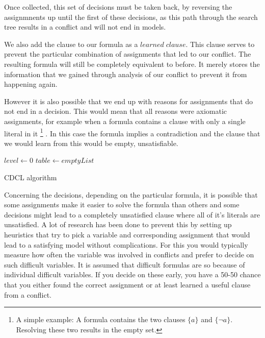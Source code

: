 Once collected, this set of decisions must be taken back, by reversing the assignmnents up until the first of these decisions, as this path through the search tree results in a conflict and will not end in models. 

We also add the clause to our formula as a $learned\; clause$. This clause serves to prevent the particular combination of assignments that led to our conflict. The resulting formula will still be completely equivalent to before. It merely stores the information that we gained through analysis of our conflict to prevent it from happening again.

However it is also possible that we end up with reasons for assignments that do not end in a decision. This would mean that all reasons were axiomatic assignments, for example when a formula contains a clause with only a single literal in it \footnote{A simple example: A formula contains the two clauses $\{a\}$ and $\{\neg a\}$. Resolving these two results in the empty set.}  .
In this case the formula implies a contradiction and the clause that we would learn from this would be empty, unsatisfiable.






\begin{algorithm}
\DontPrintSemicolon
{}
$level \gets 0$\;
$table \gets emptyList$\;
\caption{{\sc CDCL algorithm}}
\end{algorithm}


Concerning the decisions, depending on the particular formula, it is possible that some assignments make it easier to solve the formula than others and some decisions might lead to a completely unsatisfied clause where all of it's literals are unsatisfied. A lot of research has been done to prevent this by setting up heuristics that try to pick a variable and corresponding assignment that would lead to a satisfying model without complications. For this you would typically measure how often the variable was involved in conflicts and prefer to decide on such difficult variables. It is assumed that difficult formulas are so because of individual difficult variables. If you decide on these early, you have a 50-50 chance that you either found the correct assignment or at least learned a useful clause from a conflict.

